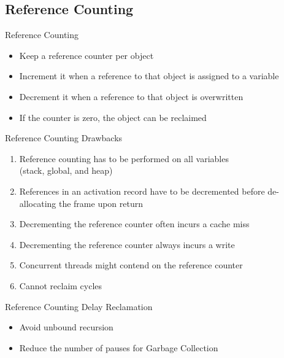 \documentclass[
14pt,
aspectratio=169,
usenames,
dvipsnames,
x11names]{beamer}
\begin{document}

\subsection{Reference Counting}

\begin{frame}{Reference Counting}
  \begin{itemize}  \setlength{\itemsep}{\fill}
  \item Keep a reference \alert{counter per object}
  \item \alert{Increment} it when a reference to that object is assigned to a variable
  \item \alert{Decrement} it when a reference to that object is overwritten
  \item If the counter is \alert{zero}, the object \alert{can be reclaimed}
  \end{itemize}
\end{frame}


\begin{frame}{Reference Counting Drawbacks}
  \begin{enumerate}  \setlength{\itemsep}{\fill}
  \item Reference counting has to be \alert{performed on all variables}\\ (stack, global, and heap)
  \item References in an activation record have to be \alert{decremented before de-allocating the frame} upon return
  \item Decrementing the reference counter \alert{often incurs a cache miss}
  \item Decrementing the reference counter \alert{always incurs a write}
  \item Concurrent threads might \alert{contend on the reference counter}
  \item \alert{Cannot reclaim cycles}
  \end{enumerate}
\end{frame}

\begin{frame}{Reference Counting Delay Reclamation}
  \begin{itemize}  \setlength{\itemsep}{\fill}
  \item Avoid \alert{unbound recursion}
  \item \alert{Reduce the number of pauses} for Garbage Collection
  \end{itemize}
\end{frame}
\end{document}
